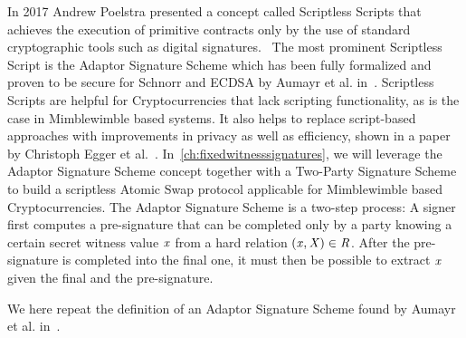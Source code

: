 In 2017 Andrew Poelstra presented a concept called Scriptless Scripts that achieves the execution of primitive contracts only by the use of standard cryptographic tools such as digital signatures.~\cite{poelstra2017scriptless}
The most prominent Scriptless Script is the Adaptor Signature Scheme which has been fully formalized and proven to be secure for Schnorr and ECDSA by Aumayr et al. in~\cite{aumayr2020bitcoinchannels}.
Scriptless Scripts are helpful for Cryptocurrencies that lack scripting functionality, as is the case in Mimblewimble based systems.
It also helps to replace script-based approaches with improvements in privacy as well as efficiency, shown in a paper by Christoph Egger et al.~\cite{egger2019atomic}.
In~\cref{ch:fixedwitnesssignatures}, we will leverage the Adaptor Signature Scheme concept together with a Two-Party Signature Scheme to build a scriptless Atomic Swap protocol applicable for Mimblewimble based Cryptocurrencies.
The Adaptor Signature Scheme is a two-step process:
A signer first computes a pre-signature that can be completed only by a party knowing a certain secret witness value $\mathit{x}$ from a hard relation $(\mathit{x}, \mathit{X}) \in \mathit{R}$.
After the pre-signature is completed into the final one, it must then be possible to extract $\mathit{x}$ given the final and the pre-signature.

We here repeat the definition of an Adaptor Signature Scheme found by Aumayr et al. in~\cite{aumayr2020bitcoinchannels}.

